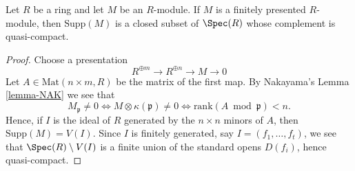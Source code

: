 \begin{lemma}
\label{lemma-support-finite-presentation-constructible}
Let $R$ be a ring and let $M$ be an $R$-module.
If $M$ is a finitely presented $R$-module, then $\text{Supp}(M)$ is a
closed subset of $\Spec(R)$ whose complement is quasi-compact.
\end{lemma}

\begin{proof}
Choose a presentation
$$
R^{\oplus m} \longrightarrow R^{\oplus n} \longrightarrow M \to 0
$$
Let $A \in \text{Mat}(n \times m, R)$ be the matrix of the first
map. By Nakayama's Lemma \ref{lemma-NAK} we see that
$$
M_{\mathfrak p} \not = 0 \Leftrightarrow
M \otimes \kappa(\mathfrak p) \not = 0 \Leftrightarrow
\text{rank}(A \bmod \mathfrak p) < n.
$$
Hence, if $I$ is the ideal of $R$ generated by the $n \times n$ minors
of $A$, then $\text{Supp}(M) = V(I)$. Since $I$
is finitely generated, say $I = (f_1, \ldots, f_t)$,
we see that $\Spec(R) \setminus V(I)$ is
a finite union of the standard opens $D(f_i)$, hence quasi-compact.
\end{proof}